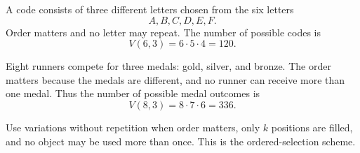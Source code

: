 \begin{examplebox}
A code consists of three different letters chosen from the six letters
\[
A,B,C,D,E,F.
\]
Order matters and no letter may repeat. The number of possible codes is
\[
V(6,3)=6\cdot5\cdot4=120.
\]
\end{examplebox}

\begin{examplebox}
Eight runners compete for three medals: gold, silver, and bronze. The order matters because the medals are different, and no runner can receive more than one medal. Thus the number of possible medal outcomes is
\[
V(8,3)=8\cdot7\cdot6=336.
\]
\end{examplebox}

\begin{remarkbox}
Use variations without repetition when order matters, only \(k\) positions are filled, and no object may be used more than once. This is the ordered-selection scheme.
\end{remarkbox}
